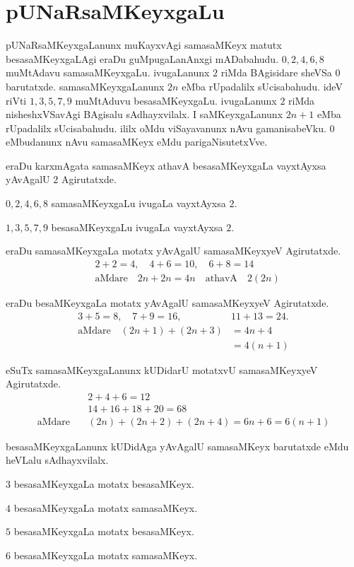 \chapter{pUNaRsaMKeyxgaLu}

pUNaRsaMKeyxgaLanunx muKayxvAgi samasaMKeyx matutx besasaMKeyxgaLAgi eraDu guMpu\-gaLanAnxgi mADabahudu. $0,2,4,6,8$ muMtAdavu samasaMKeyxgaLu. ivugaLanunx \-$2$ riMda BAgisidare sheVSa $0$ barutatxde. samasaMKeyxgaLanunx $2n$ eMba rUpadalilx sUcisa\-bahudu. ideV riVti $1,3,5,7,9$ muMtAduvu besasaMKeyxgaLu. ivugaLanunx $2$ riMda nisheshxVSavAgi BAgisalu sAdhayxvilalx. I saMKeyxgaLanunx $2n+1$ eMba rUpadalilx sUcisabahudu. ililx oMdu viSayavanunx nAvu gamanisabeVku. $0$ eMbudanunx nAvu samasaMKeyx eMdu parigaNisutetxVve.

eraDu karxmAgata samasaMKeyx athavA besasaMKeyxgaLa vayxtAyxsa yAvAgalU $2$ \-Agirutatxde.

$0,2,4,6,8$ samasaMKeyxgaLu ivugaLa vayxtAyxsa $2$. 

$1,3,5,7,9$ besasaMKeyxgaLu ivugaLa vayxtAyxsa $2$. 

eraDu samasaMKeyxgaLa motatx yAvAgalU samasaMKeyxyeV Agirutatxde.
\begin{align*}
&2+2 =4, \quad 4+6=10, \quad 6+8=14\\
&\text{aMdare}\quad 2n+2n =4n\quad \text{athavA}\quad 2(2n)
\end{align*}

eraDu besaMKeyxgaLa motatx yAvAgalU samasaMKeyxyeV Agirutatxde.
\begin{align*}
3+5=8,\quad 7+9=16,\quad &11+13 =24.\\
\text{aMdare}\quad (2n+1)+(2n+3)&= 4n+4\\
 &= 4(n+1)
\end{align*}

eSuTx samasaMKeyxgaLanunx kUDidarU motatxvU samasaMKeyxyeV Agirutatxde.
\begin{align*}
&2+4+6=12\\
&14+16+18+20=68\\
\text{aMdare}\quad &(2n)+(2n+2)+(2n+4)=6n+6=6(n+1)
\end{align*}

besasaMKeyxgaLanunx kUDidAga yAvAgalU samasaMKeyx barutatxde eMdu heVLalu sAdhayxvilalx.
\begin{description}
\item $3$ besasaMKeyxgaLa motatx besasaMKeyx.
\item $4$ besasaMKeyxgaLa motatx samasaMKeyx.
\item $5$ besasaMKeyxgaLa motatx besasaMKeyx.
\item $6$ besasaMKeyxgaLa motatx samasaMKeyx.
\end{description}

